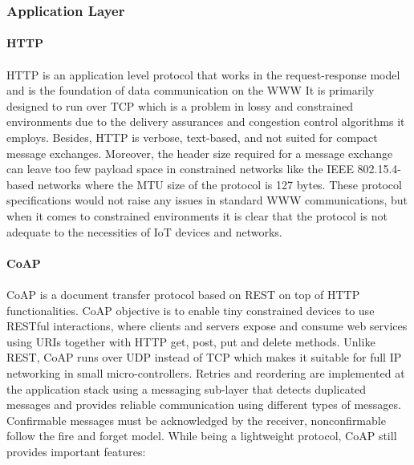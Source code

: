 \subsubsection{Application Layer}

\paragraph{\textbf{\ac{HTTP}}}
\paragraph{}
	\ac{HTTP} is an application level protocol that works in the request-response model and is the foundation of data communication on the \ac{WWW} It is primarily designed to run over \ac{TCP} which is a problem in lossy and constrained environments due to the delivery assurances and congestion control algorithms it employs. Besides, {HTTP} is verbose, text-based, and not suited for compact message exchanges. Moreover, the header size required for a message exchange can leave too few payload space in constrained networks like the IEEE 802.15.4-based networks where the \ac{MTU} size of the protocol is 127 bytes. These protocol specifications would not raise any issues in standard \ac{WWW} communications, but when it comes to constrained environments it is clear that the protocol is not adequate to the necessities of \ac{IoT} devices and networks.

\paragraph{\textbf{\ac{CoAP}}}
\paragraph{}
	\ac{CoAP} is a document transfer protocol based on \ac{REST} on top of \ac{HTTP} functionalities. \ac{CoAP} objective is to enable tiny constrained devices to use RESTful interactions, where clients and servers expose and consume web services using \ac{URIs} together with  \ac{HTTP} get, post, put and delete methods. Unlike \ac{REST}, \ac{CoAP} runs over \ac{UDP} instead of \ac{TCP} which makes it suitable for full IP networking in small micro-controllers. Retries and reordering are implemented at the application stack using a messaging sub-layer that detects duplicated messages and provides reliable communication using different types of messages. Confirmable messages must be acknowledged by the receiver, nonconfirmable follow the fire and forget model. While being a lightweight protocol, \ac{CoAP} still provides important features:
	
